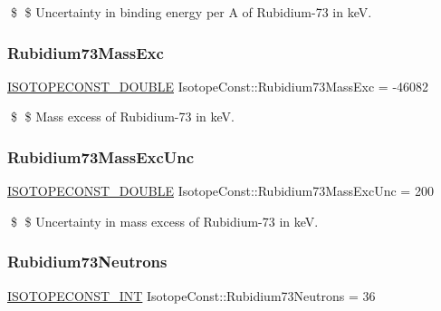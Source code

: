 \$ \$ Uncertainty in binding energy per A of Rubidium-\/73 in keV. \mbox{\label{group___isotope_const-_rubidium-_rb73_ga78386f5358c09644dfafeb2c2af73daf}} 
\subsubsection{\texorpdfstring{Rubidium73\+Mass\+Exc}{Rubidium73MassExc}}
{\footnotesize\ttfamily \mbox{\hyperlink{group___isotope_const-_macros_ga8f45a7272ce02c0b4c65c44636ed719a}{I\+S\+O\+T\+O\+P\+E\+C\+O\+N\+S\+T\+\_\+\+D\+O\+U\+B\+LE}} Isotope\+Const\+::\+Rubidium73\+Mass\+Exc = -\/46082}

\$ \$ Mass excess of Rubidium-\/73 in keV. \mbox{\label{group___isotope_const-_rubidium-_rb73_ga5ccef71ae3c3868ae349805f8e704de0}} 
\subsubsection{\texorpdfstring{Rubidium73\+Mass\+Exc\+Unc}{Rubidium73MassExcUnc}}
{\footnotesize\ttfamily \mbox{\hyperlink{group___isotope_const-_macros_ga8f45a7272ce02c0b4c65c44636ed719a}{I\+S\+O\+T\+O\+P\+E\+C\+O\+N\+S\+T\+\_\+\+D\+O\+U\+B\+LE}} Isotope\+Const\+::\+Rubidium73\+Mass\+Exc\+Unc = 200}

\$ \$ Uncertainty in mass excess of Rubidium-\/73 in keV. \mbox{\label{group___isotope_const-_rubidium-_rb73_ga3c32912469bf1e3d3f52b624fed87a24}} 
\subsubsection{\texorpdfstring{Rubidium73\+Neutrons}{Rubidium73Neutrons}}
{\footnotesize\ttfamily \mbox{\hyperlink{group___isotope_const-_macros_ga5f18360b3e99483a35c32d789e62621c}{I\+S\+O\+T\+O\+P\+E\+C\+O\+N\+S\+T\+\_\+\+I\+NT}} Isotope\+Const\+::\+Rubidium73\+Neutrons = 36}

